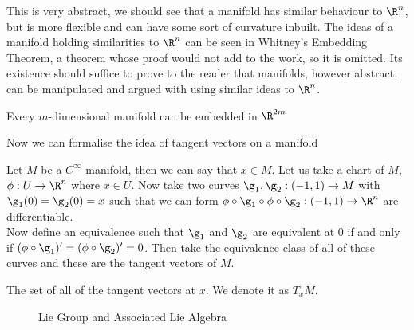 \noindent
This is very abstract, we should see that a manifold has similar behaviour to $\R^n$, but is more flexible and can have some sort of curvature inbuilt. The ideas of a manifold holding similarities to $\R^n$ can be seen in Whitney's Embedding Theorem, a theorem whose proof would not add to the work, so it is omitted. Its existence should suffice to prove to the reader that manifolds, however abstract, can be manipulated and argued with using similar ideas to $\R^n$.

\begin{nthm}
  Every $m$-dimensional manifold can be embedded in $\R^{2m}$
\end{nthm}

\noindent
Now we can formalise the idea of tangent vectors on a manifold~\cite{Lee-2009}
\begin{ndefi}
  Let $M$ be a $C^\infty$ manifold, then we can say that $x \in M$. Let us take a chart of $M$, $\phi : U \to \R^n$ where $x \in U$. Now take two curves $\g_1, \g_2 : (-1, 1) \to M$ with $\g_1(0) = \g_2(0) = x$ such that we can form $\phi \circ \g_1 \circ \phi \circ \g_2 : (-1, 1) \to \R^n$ are differentiable. \\
  Now define an equivalence such that $\g_1$ and $\g_2$ are equivalent at $0$ if and only if $(\phi \circ \g_1)' = (\phi \circ \g_2)' = 0$. Then take the equivalence class of all of these curves and these are the tangent vectors of $M$.
\end{ndefi}

\begin{ndefi}
  The set of all of the tangent vectors at $x$. We denote it as $T_x M$.
\end{ndefi}

\begin{figure}[!ht]
\centering
{}
\caption{Lie Group and Associated Lie Algebra}
\label{fig:1}
\end{figure}

